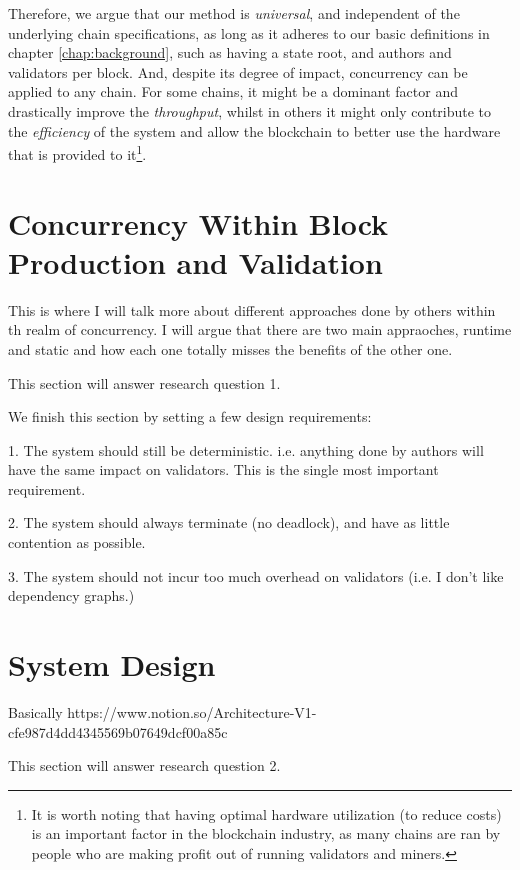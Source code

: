 Therefore, we argue that our method is \textit{universal}, and independent of the underlying chain
specifications, as long as it adheres to our basic definitions in chapter \ref{chap:background}, such as having a
state root, and authors and validators per block. And, despite its degree of impact, concurrency can be
applied to any chain. For some chains, it might be a dominant factor and drastically improve the
\textit{throughput}, whilst in others it might only contribute to the \textit{efficiency} of the
system and allow the blockchain to better use the hardware that is provided to it\footnote{It is
worth noting that having optimal hardware utilization (to reduce costs) is an important factor in the blockchain
industry, as many chains are ran by people who are making profit out of running validators and miners.}.


\section{Concurrency Within Block Production and Validation}

This is where I will talk more about different approaches done by others within th realm of
concurrency. I will argue that there are two main appraoches, runtime and static and how each one
totally misses the benefits of the other one.

This section will answer research question 1.

We finish this section by setting a few design requirements:

1. The system should still be deterministic. i.e. anything done by authors will have the same
impact on validators. This is the single most important requirement.

2. The system should always terminate (no deadlock), and have as little contention as possible.

3. The system should not incur too much overhead on validators (i.e. I don't like dependency
graphs.)

\section{System Design} \label{chap_desgin:sec:design}

Basically https://www.notion.so/Architecture-V1-cfe987d4dd4345569b07649dcf00a85c

This section will answer research question 2.
